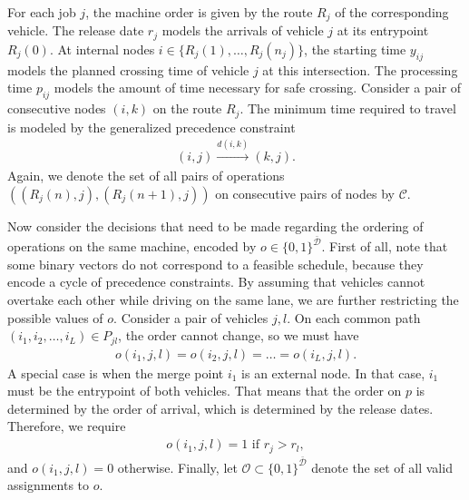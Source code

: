 \documentclass{article}
\theoremstyle{definition}
\theoremstyle{plain}
\begin{document}
For each job $j$, the machine order is given by the route $R_{j}$ of the
corresponding vehicle. The release date $r_{j}$ models the arrivals of vehicle
$j$ at its entrypoint $R_{j}(0)$. At internal nodes
$i \in \{R_{j}(1), \dots, R_{j}(n_{j})\}$, the starting time $y_{ij}$ models the
planned crossing time of vehicle $j$ at this intersection. The processing time
$p_{ij}$ models the amount of time necessary for safe crossing. Consider a pair
of consecutive nodes $(i,k)$ on the route $R_{j}$. The minimum time required to
travel is modeled by the generalized precedence constraint
\begin{align}
  (i,j) \xrightarrow{d(i,k)} (k,j) .
\end{align}
Again, we denote the set of all pairs of operations
$((R_{j}(n), j), (R_{j}(n+1), j))$ on consecutive pairs of nodes by
$\mathcal{C}$.


Now consider the decisions that need to be made regarding the ordering of
operations on the same machine, encoded by $o \in \{0,1\}^{\bar{\mathcal{D}}}$.
First of all, note that some binary vectors do not correspond to a feasible
schedule, because they encode a cycle of precedence constraints. By assuming
that vehicles cannot overtake each other while driving on the same lane, we are
further restricting the possible values of $o$. Consider a pair of vehicles
$j,l$. On each common path $(i_{1}, i_{2}, \dots, i_{L}) \in P_{jl}$, the order
cannot change, so we must have
\begin{align}
  o(i_{1},j,l) = o(i_{2},j,l) = \dots = o(i_{L},j,l).
\end{align}
A special case is when the merge point $i_{1}$ is an external node. In that
case, $i_{1}$ must be the entrypoint of both vehicles. That means that the order
on $p$ is determined by the order of arrival, which is determined by the release
dates. Therefore, we require
\begin{align}
  o(i_{1},j,l) = 1 \text{ if } r_{j} > r_{l} ,
\end{align}
and $o(i_{1},j,l) = 0$ otherwise.
Finally, let $\mathcal{O} \subset \{0,1\}^{\bar{\mathcal{D}}}$ denote the set of
all valid assignments to $o$.
\end{document}

